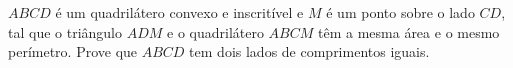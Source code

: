 $ABCD$ é um quadrilátero convexo e inscritível e $M$ é um ponto sobre o lado $CD$, tal que o
triângulo $ADM$ e o quadrilátero $ABCM$ têm a mesma área e o mesmo perímetro. Prove que
$ABCD$ tem dois lados de comprimentos iguais.